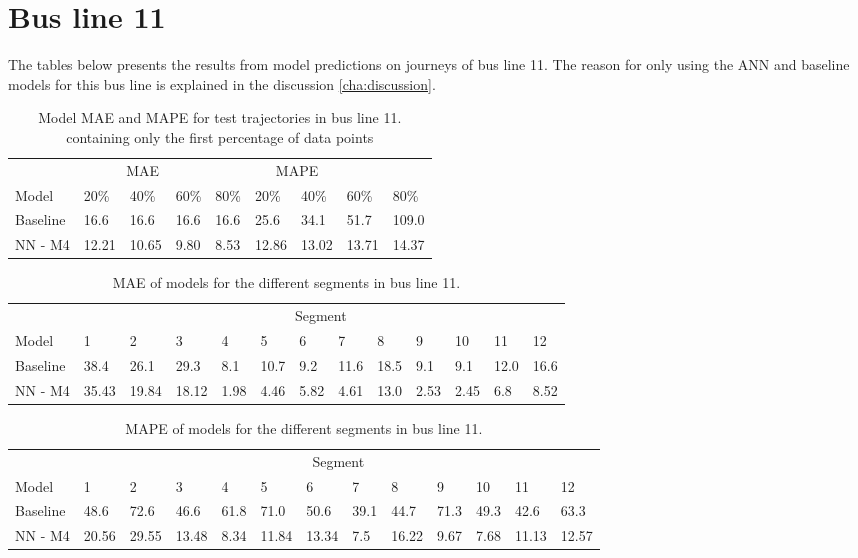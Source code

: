 \section{Bus line 11}
The tables below presents the results from model predictions on journeys of bus line 11. The reason for only using the ANN and baseline models for this bus line is explained in the discussion \ref{cha:discussion}.
\begin{table}[H]
	\centering
	\caption{Model MAE and MAPE for test trajectories in bus line 11. containing only the first percentage of data points}
	\label{tbl:models-mae-and-mape-211}
	\begin{tabular}{l | l | l | l | l || l | l | l | l }
		& \multicolumn{3}{c}{MAE} & \multicolumn{4}{c}{MAPE} \\
		Model      & 20\% & 40\% & 60\% & 80\% & 20\% & 40\% & 60\% & 80\% \\
		\hline
		Baseline & 16.6 & 16.6 & 16.6 & 16.6  & 25.6 & 34.1 & 51.7 & 109.0 \\
		NN - M4        & 12.21 &  10.65 & 9.80 &  8.53  & 12.86 & 13.02 & 13.71 & 14.37 \\
	\end{tabular}
\end{table}

\begin{table}[H]
	\centering
	\caption{MAE of models for the different segments in bus line 11.}
	\label{tbl:model-mae-of-segs-211}
	\begin{adjustbox}{center}
	\begin{tabular}{ l | l | l | l | l | l | l | l | l | l | l | l | l}
		& \multicolumn{12}{c}{Segment} \\
		Model       & 1 & 2 & 3 & 4 & 5 & 6 & 7 & 8 & 9 & 10 & 11 & 12 \\
		\hline
		Baseline  & 38.4 & 26.1 & 29.3 & 8.1 & 10.7 & 9.2 & 11.6 & 18.5 & 9.1 & 9.1  & 12.0 & 16.6 \\
		NN - M4         & 35.43& 19.84& 18.12& 1.98& 4.46& 5.82& 4.61& 13.0& 2.53& 2.45& 6.8& 8.52\\
	\end{tabular}
	\end{adjustbox}
\end{table}

\begin{table}[H]
	\centering
	\caption{MAPE of models for the different segments in bus line 11.}
	\label{fig:model-mape-of-segs-211}
	\begin{adjustbox}{center}
	\begin{tabular}{ l | l | l | l | l | l | l | l | l | l | l | l | l}
		& \multicolumn{12}{c}{Segment} \\
		Model       & 1 & 2 & 3 & 4 & 5 & 6 & 7 & 8 & 9 & 10 & 11 & 12 \\
		\hline
		Baseline  & 48.6 & 72.6 & 46.6 & 61.8 & 71.0 & 50.6 & 39.1 & 44.7 & 71.3 & 49.3  & 42.6 & 63.3 \\
		NN - M4         & 20.56& 29.55& 13.48& 8.34& 11.84& 13.34& 7.5& 16.22& 9.67& 7.68& 11.13& 12.57\\
	\end{tabular}
	\end{adjustbox}
\end{table}

